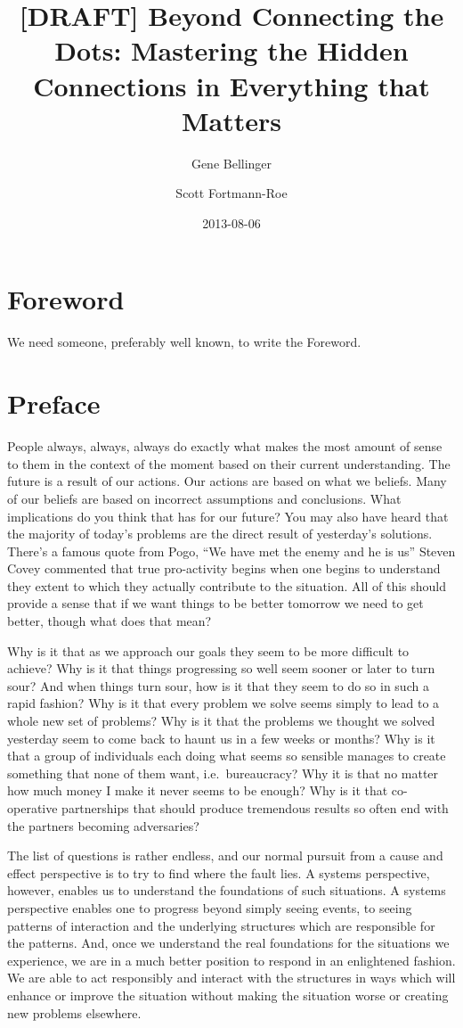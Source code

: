 \documentclass[]{memoir}
\title{{[}DRAFT{]} Beyond Connecting the Dots: Mastering the Hidden Connections
       in Everything that Matters}
\author{Gene Bellinger \and Scott Fortmann-Roe}
\date{2013-08-06}
\begin{document}
\maketitle

{
\hypersetup{linkcolor=black}
\setcounter{tocdepth}{1}
\tableofcontents
}
\section{Foreword}

We need someone, preferably well known, to write the Foreword.

\section{Preface}

People always, always, always do exactly what makes the most amount of
sense to them in the context of the moment based on their current
understanding. The future is a result of our actions. Our actions are
based on what we beliefs. Many of our beliefs are based on incorrect
assumptions and conclusions. What implications do you think that has for
our future? You may also have heard that the majority of today's
problems are the direct result of yesterday's solutions. There's a
famous quote from Pogo, ``We have met the enemy and he is us'' Steven
Covey commented that true pro-activity begins when one begins to
understand they extent to which they actually contribute to the
situation. All of this should provide a sense that if we want things to
be better tomorrow we need to get better, though what does that mean?

Why is it that as we approach our goals they seem to be more difficult
to achieve? Why is it that things progressing so well seem sooner or
later to turn sour? And when things turn sour, how is it that they seem
to do so in such a rapid fashion? Why is it that every problem we solve
seems simply to lead to a whole new set of problems? Why is it that the
problems we thought we solved yesterday seem to come back to haunt us in
a few weeks or months? Why is it that a group of individuals each doing
what seems so sensible manages to create something that none of them
want, i.e.~bureaucracy? Why it is that no matter how much money I make
it never seems to be enough? Why is it that co-operative partnerships
that should produce tremendous results so often end with the partners
becoming adversaries?

The list of questions is rather endless, and our normal pursuit from a
cause and effect perspective is to try to find where the fault lies. A
systems perspective, however, enables us to understand the foundations
of such situations. A systems perspective enables one to progress beyond
simply seeing events, to seeing patterns of interaction and the
underlying structures which are responsible for the patterns. And, once
we understand the real foundations for the situations we experience, we
are in a much better position to respond in an enlightened fashion. We
are able to act responsibly and interact with the structures in ways
which will enhance or improve the situation without making the situation
worse or creating new problems elsewhere.
\end{document}
